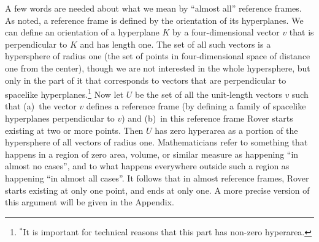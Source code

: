 A few words are needed about what we mean by ``almost all'' reference frames. As noted, a reference frame is defined by the 
orientation of its hyperplanes. We can define an orientation of a hyperplane $K$ by a four-dimensional vector $v$ that is 
perpendicular to $K$ and has length one. The set of all such vectors is a hypersphere of radius one (the set of points in 
four-dimensional space of distance one from the center), though we are not interested in the whole hypersphere, but only in 
the part of it that corresponds to vectors that are perpendicular to spacelike hyperplanes.\footnote{$^*$It is important for 
technical reasons that this part has non-zero hyperarea.} Now let $U$ be the set of all the unit-length vectors $v$ such that 
(a)~the vector $v$ defines a reference frame (by defining a family of spacelike hyperplanes perpendicular to $v$) and (b)~in 
this reference frame Rover starts existing at two or more points. Then $U$ has zero hyperarea as a portion of the hypersphere 
of all vectors of radius one. Mathematicians refer to something that happens in a region of zero area, volume, or similar 
measure as happening ``in almost no cases'', and to what happens everywhere outside such a region as happening ``in almost 
all cases''. It follows that in almost reference frames, Rover starts existing at only one point, and ends at only one.  
A more precise version of this argument will be given in the Appendix.



